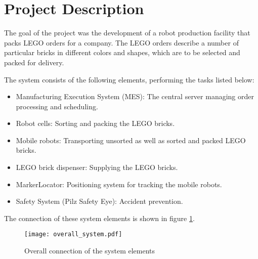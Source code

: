 \chapter*{Project Description}\label{chap:project_description}


The goal of the project was the development of a robot production facility that packs LEGO orders for a company. The LEGO orders describe a number of particular bricks in different colors and shapes, which are to be selected and packed for delivery. 

The system consists of the following elements, performing the tasks listed below:
\begin{itemize}
	\item Manufacturing Execution System (MES): The central server managing order processing and scheduling. 
	\item Robot cells: Sorting and packing the LEGO bricks. 
	\item Mobile robots: Transporting unsorted as well as sorted and packed LEGO bricks. 
	\item LEGO brick dispenser: Supplying the LEGO bricks. 
	\item MarkerLocator: Positioning system for tracking the mobile robots. 
	\item Safety System (Pilz Safety Eye): Accident prevention.
\end{itemize}

The connection of these system elements is shown in figure \ref{fig:overall_system_diagram}.
    \begin{figure}[H]
        \centering
        \texttt{[image: overall\_system.pdf]}
        \caption{Overall connection of the system elements}
        \label{fig:overall_system_diagram}
    \end{figure}

